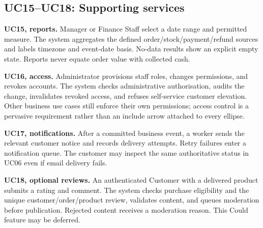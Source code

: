 \subsection{UC15--UC18: Supporting services}
\textbf{UC15, reports.} Manager or Finance Staff select a date range and permitted measure. The system aggregates the defined order/stock/payment/refund sources and labels timezone and event-date basis. No-data results show an explicit empty state. Reports never equate order value with collected cash.

\textbf{UC16, access.} Administrator provisions staff roles, changes permissions, and revokes accounts. The system checks administrative authorisation, audits the change, invalidates revoked access, and refuses self-service customer elevation. Other business use cases still enforce their own permissions; access control is a pervasive requirement rather than an include arrow attached to every ellipse.

\textbf{UC17, notifications.} After a committed business event, a worker sends the relevant customer notice and records delivery attempts. Retry failures enter a notification queue. The customer may inspect the same authoritative status in UC06 even if email delivery fails.

\textbf{UC18, optional reviews.} An authenticated Customer with a delivered product submits a rating and comment. The system checks purchase eligibility and the unique customer/order/product review, validates content, and queues moderation before publication. Rejected content receives a moderation reason. This Could feature may be deferred.
